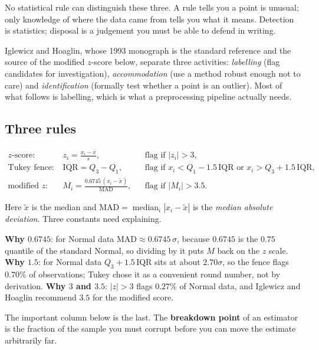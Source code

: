 \documentclass[11pt]{article}
\begin{document}
\begin{keyidea}
No statistical rule can distinguish these three. A rule tells you a point is
unusual; only knowledge of where the data came from tells you what it means.
Detection is statistics; disposal is a judgement you must be able to defend in
writing.
\end{keyidea}

Iglewicz and Hoaglin, whose 1993 monograph is the standard reference and the
source of the modified $z$-score below, separate three activities:
\emph{labelling} (flag candidates for investigation), \emph{accommodation}
(use a method robust enough not to care) and \emph{identification} (formally
test whether a point is an outlier). Most of what follows is labelling, which
is what a preprocessing pipeline actually needs.

\subsection{Three rules}
\label{sec:rules}

\begin{align}
  \text{$z$-score:}\quad & z_i = \frac{x_i - \bar x}{s},
    && \text{flag if } |z_i| > 3, \label{eq:zrule}\\[3pt]
  \text{Tukey fence:}\quad & \mathrm{IQR} = Q_3 - Q_1,
    && \text{flag if } x_i < Q_1 - 1.5\,\mathrm{IQR}
       \text{ or } x_i > Q_3 + 1.5\,\mathrm{IQR}, \label{eq:iqrrule}\\[3pt]
  \text{modified $z$:}\quad & M_i = \frac{0.6745\,(x_i - \tilde x)}{\mathrm{MAD}},
    && \text{flag if } |M_i| > 3.5. \label{eq:mzrule}
\end{align}

Here $\tilde x$ is the median and
$\mathrm{MAD} = \operatorname{median}_i |x_i - \tilde x|$ is the \emph{median
absolute deviation}. Three constants need explaining.

\textbf{Why $0.6745$}: for Normal data $\mathrm{MAD} \approx 0.6745\,\sigma$,
because $0.6745$ is the $0.75$ quantile of the standard Normal, so dividing by
it puts $M$ back on the $z$ scale. \textbf{Why $1.5$}: for Normal data
$Q_3 + 1.5\,\mathrm{IQR}$ sits at about $2.70\sigma$, so the fence flags
$0.70\%$ of observations; Tukey chose it as a convenient round number, not by
derivation. \textbf{Why $3$ and $3.5$}: $|z| > 3$ flags $0.27\%$ of Normal
data, and Iglewicz and Hoaglin recommend $3.5$ for the modified score.

The important column below is the last. The \textbf{breakdown point} of an
estimator is the fraction of the sample you must corrupt before you can move
the estimate arbitrarily far.
\end{document}
